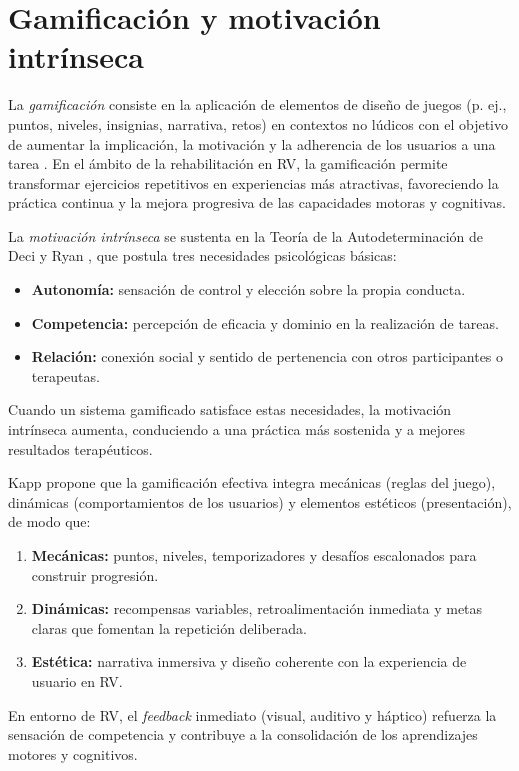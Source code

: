 \section{Gamificación y motivación intrínseca}

La \emph{gamificación} consiste en la aplicación de elementos de diseño de juegos (p. ej., puntos, niveles, insignias, narrativa, retos) en contextos no lúdicos con el objetivo de aumentar la implicación, la motivación y la adherencia de los usuarios a una tarea \cite{deterding2011defining}. En el ámbito de la rehabilitación en RV, la gamificación permite transformar ejercicios repetitivos en experiencias más atractivas, favoreciendo la práctica continua y la mejora progresiva de las capacidades motoras y cognitivas.

La \emph{motivación intrínseca} se sustenta en la Teoría de la Autodeterminación de Deci y Ryan \cite{deci1985intrinsic}, que postula tres necesidades psicológicas básicas:
\begin{itemize}
  \item \textbf{Autonomía:} sensación de control y elección sobre la propia conducta.
  \item \textbf{Competencia:} percepción de eficacia y dominio en la realización de tareas.
  \item \textbf{Relación:} conexión social y sentido de pertenencia con otros participantes o terapeutas.
\end{itemize}
Cuando un sistema gamificado satisface estas necesidades, la motivación intrínseca aumenta, conduciendo a una práctica más sostenida y a mejores resultados terapéuticos.

Kapp \cite{kapp2012gamification} propone que la gamificación efectiva integra mecánicas (reglas del juego), dinámicas (comportamientos de los usuarios) y elementos estéticos (presentación), de modo que:
\begin{enumerate}
  \item \textbf{Mecánicas:} puntos, niveles, temporizadores y desafíos escalonados para construir progresión.
  \item \textbf{Dinámicas:} recompensas variables, retroalimentación inmediata y metas claras que fomentan la repetición deliberada.
  \item \textbf{Estética:} narrativa inmersiva y diseño coherente con la experiencia de usuario en RV.
\end{enumerate}
En entorno de RV, el \emph{feedback} inmediato (visual, auditivo y háptico) refuerza la sensación de competencia y contribuye a la consolidación de los aprendizajes motores y cognitivos.
